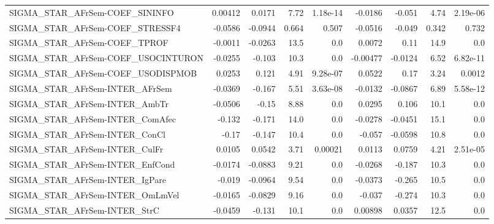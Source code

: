 \begin{tabular}{lrrrrrrrr}
SIGMA\_STAR\_AFrSem-COEF\_SININFO         &     0.00412 &       0.0171 &     7.72 & 1.18e-14 &    -0.0186 &      -0.051 &         4.74 &      2.19e-06 \\
SIGMA\_STAR\_AFrSem-COEF\_STRESSF4        &     -0.0586 &      -0.0944 &    0.664 &    0.507 &    -0.0516 &      -0.049 &        0.342 &         0.732 \\
SIGMA\_STAR\_AFrSem-COEF\_TPROF           &     -0.0011 &      -0.0263 &     13.5 &      0.0 &     0.0072 &        0.11 &         14.9 &           0.0 \\
SIGMA\_STAR\_AFrSem-COEF\_USOCINTURON     &     -0.0255 &       -0.103 &     10.3 &      0.0 &   -0.00477 &     -0.0124 &         6.52 &      6.82e-11 \\
SIGMA\_STAR\_AFrSem-COEF\_USODISPMOB      &      0.0253 &        0.121 &     4.91 & 9.28e-07 &     0.0522 &        0.17 &         3.24 &        0.0012 \\
SIGMA\_STAR\_AFrSem-INTER\_AFrSem         &     -0.0369 &       -0.167 &     5.51 & 3.63e-08 &    -0.0132 &     -0.0867 &         6.89 &      5.58e-12 \\
SIGMA\_STAR\_AFrSem-INTER\_AmbTr          &     -0.0506 &        -0.15 &     8.88 &      0.0 &     0.0295 &       0.106 &         10.1 &           0.0 \\
SIGMA\_STAR\_AFrSem-INTER\_ComAfec        &      -0.132 &       -0.171 &     14.0 &      0.0 &    -0.0278 &     -0.0451 &         15.1 &           0.0 \\
SIGMA\_STAR\_AFrSem-INTER\_ConCl          &       -0.17 &       -0.147 &     10.4 &      0.0 &     -0.057 &     -0.0598 &         10.8 &           0.0 \\
SIGMA\_STAR\_AFrSem-INTER\_CulFr          &      0.0105 &       0.0542 &     3.71 &  0.00021 &     0.0113 &      0.0759 &         4.21 &      2.51e-05 \\
SIGMA\_STAR\_AFrSem-INTER\_EnfCond        &     -0.0174 &      -0.0883 &     9.21 &      0.0 &    -0.0268 &      -0.187 &         10.3 &           0.0 \\
SIGMA\_STAR\_AFrSem-INTER\_IgPare         &      -0.019 &      -0.0964 &     9.54 &      0.0 &    -0.0373 &      -0.265 &         10.5 &           0.0 \\
SIGMA\_STAR\_AFrSem-INTER\_OmLmVel        &     -0.0165 &      -0.0829 &     9.16 &      0.0 &     -0.037 &      -0.274 &         10.3 &           0.0 \\
SIGMA\_STAR\_AFrSem-INTER\_StrC           &     -0.0459 &       -0.131 &     10.1 &      0.0 &    0.00898 &      0.0357 &         12.5 &           0.0 \\

\end{tabular}
